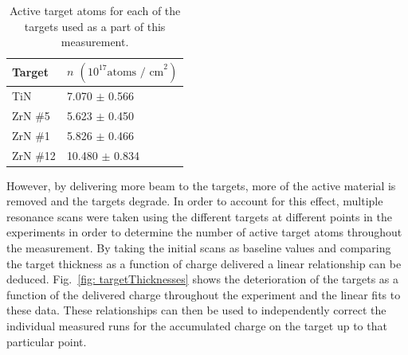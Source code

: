 \begin{table}[]
\centering
\begin{tabular}{@{}ll@{}}
\toprule
Target & $n$ $\left(10^{17} \text{atoms / cm}^{2} \right)$ \\ \midrule
TiN    & 7.070 $\pm$ 0.566                        \\
ZrN \#5  & 5.623 $\pm$ 0.450                        \\
ZrN \#1  & 5.826 $\pm$ 0.466                        \\
ZrN \#12 & 10.480 $\pm$ 0.834                       \\ \bottomrule
\end{tabular}
\caption{Active target atoms for each of the targets used as a part of this measurement. }
\label{tbl: targetAtoms}
\end{table}


However, by delivering more beam to the targets, more of the active material is removed and the targets degrade. In order to account for this effect, multiple resonance scans were taken using the different targets at different points in the experiments in order to determine the number of active target atoms throughout the measurement. By taking the initial scans as baseline values and comparing the target thickness as a function of charge delivered a linear relationship can be deduced. Fig.\ \ref{fig: targetThicknesses} shows the deterioration of the targets as a function of the delivered charge throughout the experiment and the linear fits to these data. These relationships can then be used to independently correct the individual measured runs for the accumulated charge on the target up to that particular point. 

